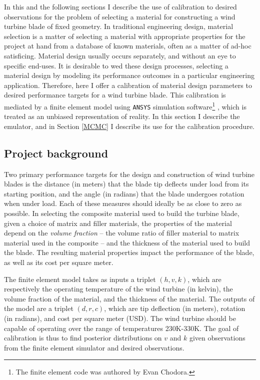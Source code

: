 \documentclass{article}
\begin{document}
In this and the following sections I describe the use of calibration to desired observations for the problem of selecting a material for constructing a wind turbine blade of fixed geometry. In traditional engineering design, material selection is a matter of selecting a material with appropriate properties for the project at hand from a database of known materials, often as a matter of ad-hoc satisficing. Material design usually occurs separately, and without an eye to specific end-uses. It is desirable to wed these design processes, selecting a material design by modeling its performance outcomes in a particular engineering application. Therefore, here I offer a calibration of material design parameters to desired performance targets for a wind turbine blade. This calibration is mediated by a finite element model using \texttt{ANSYS} simulation software\footnote{
The finite element code was authored by Evan Chodora.
}
, which is treated as an unbiased representation of reality. In this section I describe the emulator, and in Section \ref{MCMC} I describe its use for the calibration procedure.

\subsection{Project background}

Two primary performance targets for the design and construction of wind turbine blades is the distance (in meters) that the blade tip deflects under load from its starting position, and the angle (in radians) that the blade undergoes rotation when under load. Each of these measures should ideally be as close to zero as possible. In selecting the composite material used to build the turbine blade, given a choice of matrix and filler materials, the properties of the material depend on the \textit{volume fraction} -- the volume ratio of filler material to matrix material used in the composite -- and the thickness of the material used to build the blade. The resulting material properties impact the performance of the blade, as well as its cost per square meter. 

The finite element model takes as inputs a triplet $(h,v,k)$, which are respectively the operating temperature of the wind turbine (in kelvin), the volume fraction of the material, and the thickness of the material. The outputs of the model are a triplet $(d,r,c)$, which are tip deflection (in meters), rotation (in radians), and cost per square meter (USD). The wind turbine should be capable of operating over the range of temperatures 230K-330K. The goal of calibration is thus to find posterior distributions on $v$ and $k$ given observations from the finite element simulator and desired observations.
\end{document}
